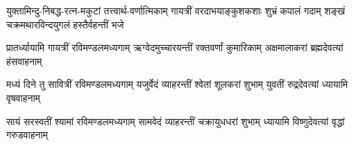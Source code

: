 \begin{center}
{युक्तामिन्दु-निबद्ध-रत्न-मकुटां तत्त्वार्थ-वर्णात्मिकाम्}
{गायत्रीं वरदाभयाङ्कुशकशाः शुभ्रं कपालं गदाम्}
{शङ्खं चक्रमथारविन्दयुगलं हस्तैर्वहन्तीं भजे}

\threelineshloka
{प्रातर्ध्यायामि गायत्रीं रविमण्डलमध्यगाम्}
{ऋग्वेदमुच्चारयन्तीं रक्तवर्णां कुमारिकाम्}
{अक्षमालाकरां ब्रह्मदेवत्यां हंसवाहनाम्}

\threelineshloka
{मध्यं दिने तु सावित्रीं रविमण्डलमध्यगाम्}
{यजुर्वेदं व्याहरन्तीं श्वेतां शूलकरां शुभाम्}
{युवतीं रुद्रदेवत्यां ध्यायामि वृषवाहनाम्}

\threelineshloka
{सायं सरस्वतीं श्यामां रविमण्डलमध्यगाम्}
{सामवेदं व्याहरन्तीं चक्रायुधधरां शुभाम्}
{ध्यायामि विष्णुदेवत्यां वृद्धां गरुडवाहनाम्}







\end{center}
